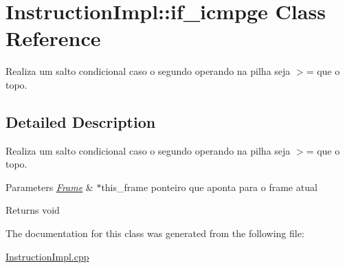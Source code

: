\hypertarget{class_instruction_impl_1_1if__icmpge}{}\section{Instruction\+Impl\+:\+:if\+\_\+icmpge Class Reference}
\label{class_instruction_impl_1_1if__icmpge}


Realiza um salto condicional caso o segundo operando na pilha seja $>$= que o topo.  




\subsection{Detailed Description}
Realiza um salto condicional caso o segundo operando na pilha seja $>$= que o topo. 


\begin{DoxyParams}{Parameters}
{\em \hyperlink{struct_frame}{Frame}} & $\ast$this\+\_\+frame ponteiro que aponta para o frame atual \\
\hline
\end{DoxyParams}
\begin{DoxyReturn}{Returns}
void 
\end{DoxyReturn}


The documentation for this class was generated from the following file\+:\begin{DoxyCompactItemize}
\item 
\hyperlink{_instruction_impl_8cpp}{Instruction\+Impl.\+cpp}\end{DoxyCompactItemize}
